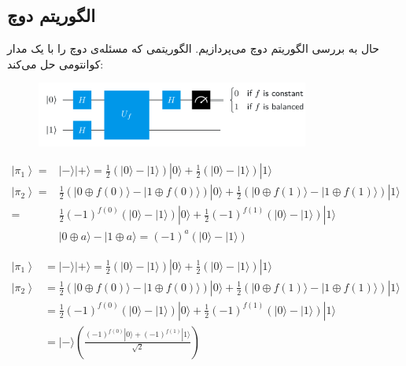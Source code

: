 \documentclass{book}
\begin{document}
\subsection{الگوریتم دوچ}

حال به بررسی الگوریتم دوچ می‌پردازیم. الگوریتمی که مسئله‌ی دوچ را با یک مدار کوانتومی حل می‌کند:\\
\begin{center}
\begin{figure}[ht]
	\centering
	\includegraphics[width=0.8\textwidth]{Deutsch algorithm.png}
	\caption{}
\end{figure}
\end{center}


$$
\begin{aligned}
	\left|\pi_1\right\rangle= & |-\rangle|+\rangle=\frac{1}{2}(|0\rangle-|1\rangle)|0\rangle+\frac{1}{2}(|0\rangle-|1\rangle)|1\rangle \\
	\left|\pi_2\right\rangle= & \frac{1}{2}(|0 \oplus f(0)\rangle-|1 \oplus f(0)\rangle)|0\rangle+\frac{1}{2}(|0 \oplus f(1)\rangle-|1 \oplus f(1)\rangle)|1\rangle \\
	= & \frac{1}{2}(-1)^{f(0)}(|0\rangle-|1\rangle)|0\rangle+\frac{1}{2}(-1)^{f(1)}(|0\rangle-|1\rangle)|1\rangle \\
	& |0 \oplus a\rangle-|1 \oplus a\rangle=(-1)^a(|0\rangle-|1\rangle)
\end{aligned}
$$

$$
\begin{aligned}
	\left|\pi_1\right\rangle & =|-\rangle|+\rangle=\frac{1}{2}(|0\rangle-|1\rangle)|0\rangle+\frac{1}{2}(|0\rangle-|1\rangle)|1\rangle \\
	\left|\pi_2\right\rangle & =\frac{1}{2}(|0 \oplus f(0)\rangle-|1 \oplus f(0)\rangle)|0\rangle+\frac{1}{2}(|0 \oplus f(1)\rangle-|1 \oplus f(1)\rangle)|1\rangle \\
	& =\frac{1}{2}(-1)^{f(0)}(|0\rangle-|1\rangle)|0\rangle+\frac{1}{2}(-1)^{f(1)}(|0\rangle-|1\rangle)|1\rangle \\
	& =|-\rangle\left(\frac{(-1)^{f(0)}|0\rangle+(-1)^{f(1)}|1\rangle}{\sqrt{2}}\right)
\end{aligned}
$$
\end{document}
